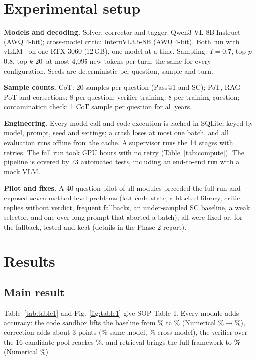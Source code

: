 \documentclass[conference]{IEEEtran}
\begin{document}
\section{Experimental setup}
\textbf{Models and decoding.} Solver, corrector and tagger: Qwen3-VL-8B-Instruct~\cite{qwen3vl}
(AWQ 4-bit); cross-model critic: InternVL3.5-8B (AWQ 4-bit). Both run with vLLM~\cite{vllm} on
one RTX 3060 (12\,GB), one model at a time. Sampling: $T{=}0.7$, top-$p$ 0.8, top-$k$ 20, at most
4{,}096 new tokens per turn, the same for every configuration. Seeds are deterministic per
question, sample and turn.

\textbf{Sample counts.} CoT: 20 samples per question (Pass@1 and SC); PoT, RAG-PoT and
corrections: 8 per question; verifier training: 8 per training question; contamination check: 1
CoT sample per question for all years.

\textbf{Engineering.} Every model call and code execution is cached in SQLite, keyed by model,
prompt, seed and settings; a crash loses at most one batch, and all evaluation runs offline from
the cache. A supervisor runs the 14 stages with retries. The full run took \TotalHours{} GPU
hours with no retry (Table~\ref{tab:compute}). The pipeline is covered by 73 automated tests,
including an end-to-end run with a mock VLM.

\textbf{Pilot and fixes.} A 40-question pilot of all modules preceded the full run and exposed
seven method-level problems (lost code state, a blocked library, critic replies without verdict,
frequent fallbacks, an under-sampled SC baseline, a weak selector, and one over-long prompt that
aborted a batch); all were fixed or, for the fallback, tested and kept (details in the Phase-2
report).



\section{Results}


\subsection{Main result}
Table~\ref{tab:table1} and Fig.~\ref{fig:table1} give SOP Table~I. Every module adds accuracy:
the code sandbox lifts the baseline from \BaseAcc\% to \PotAcc\% (Numerical \BaseNum\%$\to$\PotNum\%),
correction adds about 3 points (\CsAcc\% same-model, \CcAcc\% cross-model), the verifier over
the 16-candidate pool reaches \VerAcc\%, and retrieval brings the full framework to
\textbf{\FullAcc\%} (Numerical \FullNum\%).
\end{document}
